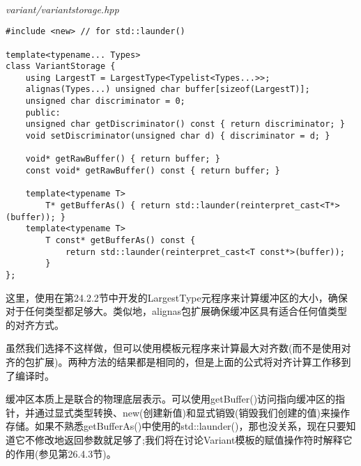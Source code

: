 \hspace*{\fill} \\ %
\noindent
\textit{variant/variantstorage.hpp}
\begin{lstlisting}[style=styleCXX]
#include <new> // for std::launder()

template<typename... Types>
class VariantStorage {
	using LargestT = LargestType<Typelist<Types...>>;
	alignas(Types...) unsigned char buffer[sizeof(LargestT)];
	unsigned char discriminator = 0;
	public:
	unsigned char getDiscriminator() const { return discriminator; }
	void setDiscriminator(unsigned char d) { discriminator = d; }
	
	void* getRawBuffer() { return buffer; }
	const void* getRawBuffer() const { return buffer; }
	
	template<typename T>
		T* getBufferAs() { return std::launder(reinterpret_cast<T*>(buffer)); }
	template<typename T>
		T const* getBufferAs() const {
			return std::launder(reinterpret_cast<T const*>(buffer));
		}
};
\end{lstlisting}

这里，使用在第24.2.2节中开发的LargestType元程序来计算缓冲区的大小，确保对于任何类型都足够大。类似地，alignas包扩展确保缓冲区具有适合任何值类型的对齐方式。

\begin{tcolorbox}[colback=webgreen!5!white,colframe=webgreen!75!black]
\hspace*{0.75cm}虽然我们选择不这样做，但可以使用模板元程序来计算最大对齐数(而不是使用对齐的包扩展)。两种方法的结果都是相同的，但是上面的公式将对齐计算工作移到了编译时。
\end{tcolorbox}

缓冲区本质上是联合的物理底层表示。可以使用getBuffer()访问指向缓冲区的指针，并通过显式类型转换、new(创建新值)和显式销毁(销毁我们创建的值)来操作存储。如果不熟悉getBufferAs()中使用的std::launder()，那也没关系，现在只要知道它不修改地返回参数就足够了;我们将在讨论Variant模板的赋值操作符时解释它的作用(参见第26.4.3节)。






































